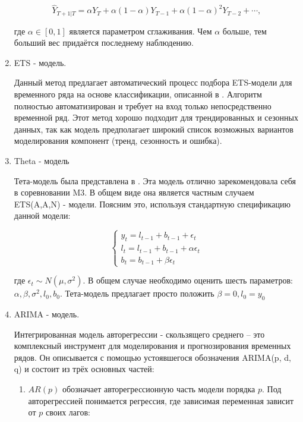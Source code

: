 \documentclass[a4paper,12pt]{article}
\begin{document}
\begin{enumerate}
	 \[   \hat{Y}_{T+1| T} = \alpha Y_T	 + \alpha(1 - \alpha)Y_{T-1} + \alpha(1 - \alpha)^2Y_{T - 2} + \cdots,\]
	 
	 где $ \alpha \in [0, 1]$ является параметром сглаживания. Чем $ \alpha $ больше, тем больший вес придаётся последнему наблюдению. 
	 
	 \item ETS - модель.
	 
	 Данный метод предлагает автоматический процесс подбора ETS-модели для временного ряда на основе классификации, описанной в \cite{ets}. Алгоритм полностью автоматизирован и требует на вход только непосредственно временной ряд. Этот метод хорошо подходит для трендированных и сезонных данных, так как модель предполагает широкий список возможных вариантов моделирования компонент (тренд, сезонность и ошибка). 
	 
	 \item Theta - модель
	 
	 Тета-модель была представлена в \cite{theta}. Эта модель отлично зарекомендовала себя в соревновании M3. В общем виде она является частным случаем ETS(A,A,N) - модели. Поясним это, используя стандартную спецификацию данной модели:
	 
	 \[ 
	 \begin{cases}
	 	y_t = l_{t-1} + b_{t - 1} + \epsilon_t\\ 
	 	l_t = l_{t - 1} + b_{t - 1} + \alpha \epsilon_t\\
	 	b_t = b_{t - 1} + \beta \epsilon_t
	 \end{cases} 
	  \]
	  
	  где $ \epsilon_t \sim N(\mu, \sigma^2) $. В общем случае необходимо оценить шесть параметров: $ \alpha, \beta, \sigma^2, l_0, b_0 $. Тета-модель предлагает просто положить $ \beta = 0, l_0 = y_0 $
	 
	 \item ARIMA - модель.
	 
	 Интегрированная модель авторегрессии - скользящего среднего -- это комплексный инструмент для моделирования и прогнозирования временных рядов. Он описывается с помощью устоявшегося обозначения ARIMA(p, d, q)  и состоит из трёх основных частей:
	 
	 \begin{enumerate}[\Sun]
	 	\item $ AR(p) $ обозначает авторегрессионную часть модели порядка $ p $. Под авторегрессией понимается регрессия, где зависимая переменная зависит от $ p $ своих лагов:
	 	

\end{enumerate}
\end{enumerate}
\end{document}
